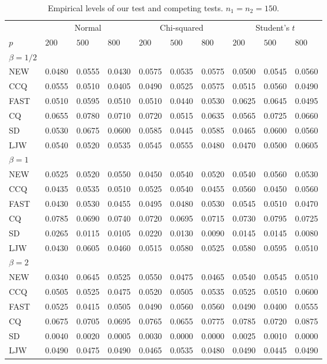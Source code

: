 \documentclass[3p]{elsarticle}
\theoremstyle{plain}
\theoremstyle{definition}
\theoremstyle{remark}
\begin{document}
\begin{table}[ht]
\caption{Empirical levels of our test and competing tests. $n_1=n_2=150$.} 
\label{hahaha3}
\vspace{3mm}
\centering
\begin{tabular}{llllllllll}
\toprule
    &   \multicolumn{3}{c}{Normal} & \multicolumn{3}{c}{Chi-squared}& \multicolumn{3}{c}{Student's $t$}  \\
    \cmidrule(r){2-4}
\cmidrule(r){5-7}
\cmidrule(r){8-10}
    $p$ & $200$ &  $500$ & $800$ & $200$  & $500$ & $800$ & $200$ & $500$ & $800$ \\ 
\midrule
    $\beta=1/2$\\
NEW & 0.0480 & 0.0555 & 0.0430 & 0.0575 & 0.0535 & 0.0575 & 0.0500 & 0.0545 & 0.0560 \\ 
CCQ & 0.0555 & 0.0510 & 0.0405 & 0.0490 & 0.0525 & 0.0575 & 0.0515 & 0.0560 & 0.0490 \\ 
FAST & 0.0510 & 0.0595 & 0.0510 & 0.0510 & 0.0440 & 0.0530 & 0.0625 & 0.0645 & 0.0495 \\ 
CQ & 0.0655 & 0.0780 & 0.0710 & 0.0720 & 0.0515 & 0.0635 & 0.0565 & 0.0725 & 0.0660 \\ 
SD & 0.0530 & 0.0675 & 0.0600 & 0.0585 & 0.0445 & 0.0585 & 0.0465 & 0.0600 & 0.0560 \\ 
LJW & 0.0540 & 0.0520 & 0.0535 & 0.0545 & 0.0555 & 0.0480 & 0.0470 & 0.0500 & 0.0605 \\ 
    $\beta=1$\\
NEW & 0.0525 & 0.0520 & 0.0550 & 0.0450 & 0.0540 & 0.0520 & 0.0540 & 0.0560 & 0.0530 \\ 
CCQ & 0.0435 & 0.0535 & 0.0510 & 0.0525 & 0.0540 & 0.0455 & 0.0560 & 0.0450 & 0.0560 \\ 
FAST & 0.0430 & 0.0530 & 0.0455 & 0.0495 & 0.0480 & 0.0530 & 0.0545 & 0.0510 & 0.0470 \\ 
CQ & 0.0785 & 0.0690 & 0.0740 & 0.0720 & 0.0695 & 0.0715 & 0.0730 & 0.0795 & 0.0725 \\ 
SD & 0.0265 & 0.0115 & 0.0105 & 0.0220 & 0.0130 & 0.0090 & 0.0145 & 0.0145 & 0.0080 \\ 
LJW & 0.0430 & 0.0605 & 0.0460 & 0.0515 & 0.0580 & 0.0525 & 0.0580 & 0.0595 & 0.0510 \\ 
    $\beta=2$\\
NEW & 0.0340 & 0.0645 & 0.0525 & 0.0550 & 0.0475 & 0.0465 & 0.0540 & 0.0545 & 0.0510 \\ 
CCQ & 0.0505 & 0.0525 & 0.0475 & 0.0520 & 0.0505 & 0.0535 & 0.0525 & 0.0510 & 0.0600 \\ 
FAST & 0.0525 & 0.0415 & 0.0505 & 0.0490 & 0.0560 & 0.0560 & 0.0490 & 0.0400 & 0.0555 \\ 
CQ & 0.0675 & 0.0705 & 0.0695 & 0.0765 & 0.0655 & 0.0775 & 0.0785 & 0.0720 & 0.0875 \\ 
SD & 0.0040 & 0.0020 & 0.0005 & 0.0030 & 0.0000 & 0.0000 & 0.0025 & 0.0010 & 0.0000 \\ 
LJW & 0.0490 & 0.0475 & 0.0490 & 0.0465 & 0.0535 & 0.0480 & 0.0490 & 0.0445 & 0.0490 \\ 
\bottomrule
\end{tabular}
\end{table}
\end{document}
